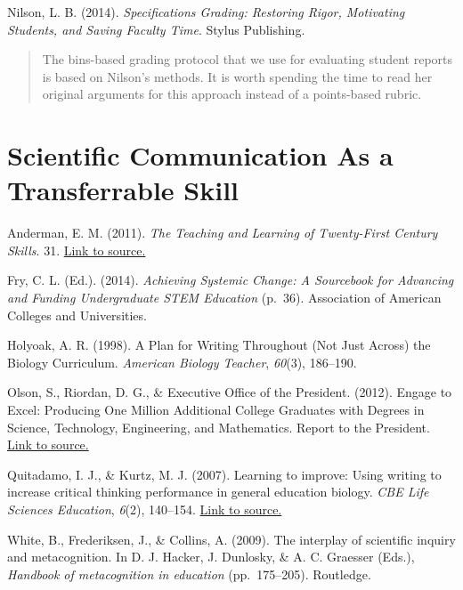 \documentclass[
]{book}
\begin{document}
Nilson, L. B. (2014). \emph{Specifications Grading: Restoring Rigor, Motivating Students, and Saving Faculty Time}. Stylus Publishing.

\begin{quote}
The bins-based grading protocol that we use for evaluating student reports is based on Nilson's methods. It is worth spending the time to read her original arguments for this approach instead of a points-based rubric.
\end{quote}

\hypertarget{scientific-communication-as-a-transferrable-skill}{%
\section{Scientific Communication As a Transferrable Skill}\label{scientific-communication-as-a-transferrable-skill}}

Anderman, E. M. (2011). \emph{The Teaching and Learning of Twenty-First Century Skills}. 31. \href{https://www.the-registry.org/Portals/0/Documents/Credentials/Afterschool/Course\%203/Module\%201\%20readings/21st_CenturyLearning\%20Skills\%20c-3.pdf}{Link to source.}

Fry, C. L. (Ed.). (2014). \emph{Achieving Systemic Change: A Sourcebook for Advancing and Funding Undergraduate STEM Education} (p.~36). Association of American Colleges and Universities.

Holyoak, A. R. (1998). A Plan for Writing Throughout (Not Just Across) the Biology Curriculum. \emph{American Biology Teacher}, \emph{60}(3), 186--190.

Olson, S., Riordan, D. G., \& Executive Office of the President. (2012). Engage to Excel: Producing One Million Additional College Graduates with Degrees in Science, Technology, Engineering, and Mathematics. Report to the President. \href{https://go.libproxy.wakehealth.edu/login?url=https://search.ebscohost.com/login.aspx?direct=true\&db=eric\&AN=ED541511\&site=ehost-live}{Link to source.}

Quitadamo, I. J., \& Kurtz, M. J. (2007). Learning to improve: Using writing to increase critical thinking performance in general education biology. \emph{CBE Life Sciences Education}, \emph{6}(2), 140--154. \href{https://doi.org/10.1187/cbe.06-11-0203}{Link to source.}

White, B., Frederiksen, J., \& Collins, A. (2009). The interplay of scientific inquiry and metacognition. In D. J. Hacker, J. Dunlosky, \& A. C. Graesser (Eds.), \emph{Handbook of metacognition in education} (pp.~175--205). Routledge.
\end{document}
